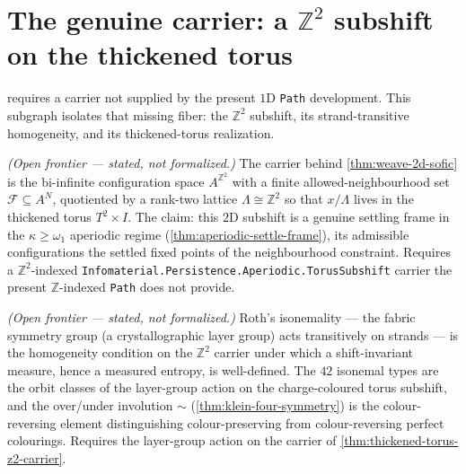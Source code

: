 \section{The genuine carrier: a $\mathbb{Z}^2$ subshift on the thickened torus}

 requires a carrier not supplied by the present
$1$D \texttt{Path} development.  This subgraph isolates that missing fiber: the
$\mathbb{Z}^2$ subshift, its strand-transitive homogeneity, and its
thickened-torus realization.

\begin{theorem}\label{thm:thickened-torus-z2-carrier}\notready{}
\emph{(Open frontier --- stated, not formalized.)} The carrier behind \cref{thm:weave-2d-sofic}
is the bi-infinite configuration space $A^{\mathbb{Z}^2}$ with a finite allowed-neighbourhood
set $\mathcal{F}\subseteq A^N$, quotiented by a rank-two lattice $\Lambda\cong\mathbb{Z}^2$ so
that $x/\Lambda$ lives in the thickened torus $T^2\times I$. The claim: this $2$D subshift is
a genuine settling frame in the $\kappa\geq\omega_1$ aperiodic regime
(\cref{thm:aperiodic-settle-frame}), its admissible configurations the settled fixed points of
the neighbourhood constraint. Requires a $\mathbb{Z}^2$-indexed
\texttt{Infomaterial.Persistence.Aperiodic.TorusSubshift} carrier the present $\mathbb{Z}$-indexed
\texttt{Path} does not provide.
\end{theorem}

\begin{theorem}\label{thm:isonemal-layergroup-transitivity}\notready{}
\emph{(Open frontier --- stated, not formalized.)} Roth's isonemality --- the fabric
symmetry group (a crystallographic layer group) acts transitively on strands --- is the
homogeneity condition on the $\mathbb{Z}^2$ carrier under which a shift-invariant measure,
hence a measured entropy, is well-defined. The $42$ isonemal types are the orbit classes of
the layer-group action on the charge-coloured torus subshift, and the over/under involution
$\sim$ (\cref{thm:klein-four-symmetry}) is the colour-reversing element distinguishing
colour-preserving from colour-reversing perfect colourings. Requires the layer-group action
on the carrier of \cref{thm:thickened-torus-z2-carrier}.
\end{theorem}

